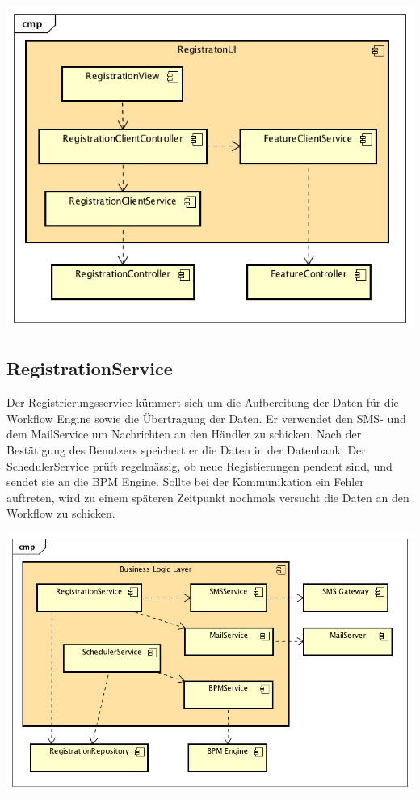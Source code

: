 \begin{center}
	\includegraphics[scale=0.8]{WebComponentLevel2.png}
\end{center}
\newpage
\subsection{RegistrationService}
\label{reg-service}

Der Registrierungsservice kümmert sich um die Aufbereitung der Daten für die Workflow Engine sowie die Übertragung der Daten. Er verwendet den SMS- und dem MailService um Nachrichten an den Händler zu schicken. Nach der Bestätigung des Benutzers speichert er die Daten in der Datenbank. Der SchedulerService prüft regelmässig, ob neue Registierungen pendent sind, und sendet sie an die BPM Engine. Sollte bei der Kommunikation ein Fehler auftreten, wird zu einem späteren Zeitpunkt nochmals versucht die Daten an den Workflow zu schicken.
\begin{center}
	\includegraphics[scale=0.65]{RegistrationServicesLevel2.png}
\end{center}
